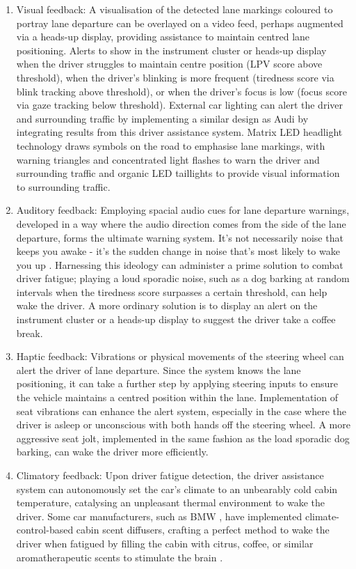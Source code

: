 \documentclass[10pt,conference]{IEEEtran}
\begin{document}
\begin{enumerate}[label=\alph*.]
    \item Visual feedback: A visualisation of the detected lane markings coloured to portray lane departure can be overlayed on a video feed, perhaps augmented via a heads-up display, providing assistance to maintain centred lane positioning. Alerts to show in the instrument cluster or heads-up display when the driver struggles to maintain centre position (LPV score above threshold), when the driver's blinking is more frequent (tiredness score via blink tracking above threshold), or when the driver's focus is low (focus score via gaze tracking below threshold). External car lighting can alert the driver and surrounding traffic by implementing a similar design as Audi \cite{b19} by integrating results from this driver assistance system. Matrix LED headlight technology draws symbols on the road to emphasise lane markings, with warning triangles and concentrated light flashes to warn the driver and surrounding traffic and organic LED taillights to provide visual information to surrounding traffic.
    \item Auditory feedback: Employing spacial audio cues for lane departure warnings, developed in a way where the audio direction comes from the side of the lane departure, forms the ultimate warning system. It's not necessarily noise that keeps you awake - it's the sudden change in noise that's most likely to wake you up \cite{b20}. Harnessing this ideology can administer a prime solution to combat driver fatigue; playing a loud sporadic noise, such as a dog barking at random intervals when the tiredness score surpasses a certain threshold, can help wake the driver. A more ordinary solution is to display an alert on the instrument cluster or a heads-up display to suggest the driver take a coffee break.
    \item Haptic feedback: Vibrations or physical movements of the steering wheel can alert the driver of lane departure. Since the system knows the lane positioning, it can take a further step by applying steering inputs to ensure the vehicle maintains a centred position within the lane. Implementation of seat vibrations can enhance the alert system, especially in the case where the driver is asleep or unconscious with both hands off the steering wheel. A more aggressive seat jolt, implemented in the same fashion as the load sporadic dog barking, can wake the driver more efficiently.
    \item Climatory feedback: Upon driver fatigue detection, the driver assistance system can autonomously set the car's climate to an unbearably cold cabin temperature, catalysing an unpleasant thermal environment to wake the driver. Some car manufacturers, such as BMW \cite{b21}, have implemented climate-control-based cabin scent diffusers, crafting a perfect method to wake the driver when fatigued by filling the cabin with citrus, coffee, or similar aromatherapeutic scents to stimulate the brain \cite{b22}.
\end{enumerate}
\end{document}

